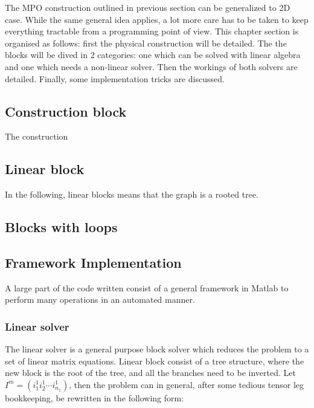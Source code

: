 The MPO construction outlined in previous section can be generalized to 2D case. While the same general idea applies, a lot more care has to be taken to keep everything tractable from a programming point of view. This chapter section is organised as follows: first the physical construction will be detailed. The the blocks will be dived in 2 categories: one which can be solved with linear algebra and one which needs a non-linear solver. Then the workings of both solvers are detailed. Finally, some implementation tricks are discussed.

\subsection{Construction block}
The construction

\subsection{Linear block}

In the following, linear blocks means that the graph is a rooted tree.

\subsection{Blocks with loops}

\subsection{Framework Implementation}

A large part of the code written consist of a general framework in Matlab to perform many operations in an automated manner.

\subsubsection{Linear solver}

The linear solver is a general purpose block solver which reduces the problem to a set of linear matrix equations. Linear block consist of a tree structure, where the new block is the root of the tree, and all the branches need to be inverted.  Let $ I^m = (i^1_1 i^1_2 \cdots i^1_{n_1})$, then the problem can in general, after some tedious tensor leg bookkeeping, be rewritten in the following form:

